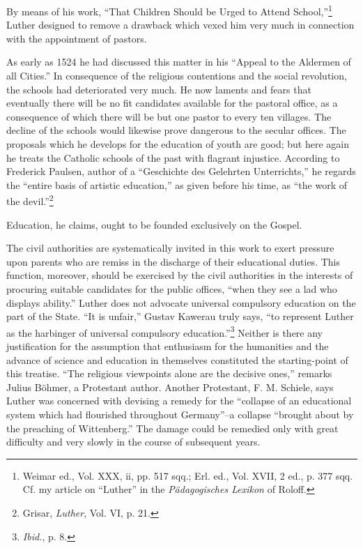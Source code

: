 By means of his work, “That Children Should be Urged to Attend
School,”\footnote{Weimar ed., Vol. XXX, ii, pp. 517 sqq.; Erl. ed., Vol. XVII, 2 ed., p. 377 sqq. Cf. my
article on “Luther” in the \textit{Pädagogisches Lexikon} of Roloff.}
Luther designed to remove a drawback which vexed him
very much in connection with the appointment of pastors.

As early as 1524 he had discussed this matter in his “Appeal to the Aldermen
of all Cities.” In consequence of the religious contentions and the
social revolution, the schools had deteriorated very much. He now laments
and fears that eventually there will be no fit candidates available for the
pastoral office, as a consequence of which there will be but one pastor to
every ten villages. The decline of the schools would likewise prove dangerous
to the secular offices. The proposals which he develops for the education of
youth are good; but here again he treats the Catholic schools of the past
with flagrant injustice. According to Frederick Paulsen, author of a “Geschichte
des Gelehrten Unterrichts,” he regards the “entire basis of artistic
education,” as given before his time, as “the work of the devil.”\footnote{Grisar, \textit{Luther}, Vol. VI, p. 21.}

Education, he claims, ought to be founded exclusively on the Gospel.

The civil authorities are systematically invited in this work to exert
pressure upon parents who are remiss in the discharge of their educational duties.
This function, moreover, should be exercised by the civil authorities in the
interests of procuring suitable candidates for the public offices, “when they
see a lad who displays ability.” Luther does not advocate universal compulsory
education on the part of the State. “It is unfair,” Gustav Kawerau
truly says, “to represent Luther as the harbinger of universal compulsory
education.”\footnote{\textit{Ibid.}, p. 8.}
Neither is there any justification for the assumption that
enthusiasm for the humanities and the advance of science and education in
themselves constituted the starting-point of this treatise. “The religious
viewpoints alone are the decisive ones,” remarks Julius Böhmer, a Protestant
author. Another Protestant, F. M. Schiele, says Luther was concerned with
devising a remedy for the “collapse of an educational system which had
flourished throughout Germany”--a collapse “brought about by the preaching
of Wittenberg.” The damage could be remedied only with great difficulty
and very slowly in the course of subsequent years.

